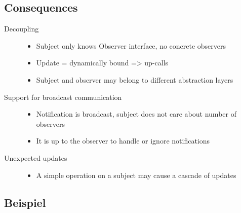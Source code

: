 \documentclass[a4paper, 11pt]{article}
\begin{document}
\subsection{Consequences}
\begin{description}
	\item[Decoupling] \hfill
		\begin{itemize}
			\item Subject only knows Observer interface, no concrete observers
			\item Update = dynamically bound => up-calls
			\item Subject and observer may belong to different abstraction layers
		\end{itemize}
	\item[Support for broadcast communication] \hfill
		\begin{itemize}
			\item Notification is broadcast, subject does not care about number of observers
			\item It is up to the observer to handle or ignore notifications
		\end{itemize}
	\item[Unexpected updates] \hfill
		\begin{itemize}
			\item A simple operation on a subject may cause a cascade of updates
		\end{itemize}
\end{description}

\subsection{Beispiel}



\end{document}
